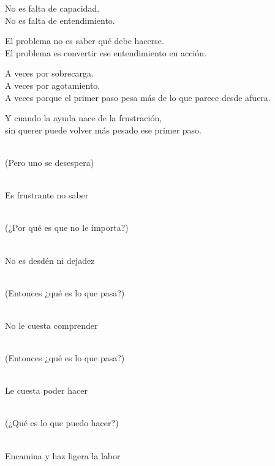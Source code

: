 \begin{lyrics}


No es falta de capacidad.\\
No es falta de entendimiento.

El problema no es saber qué debe hacerse.\\
El problema es convertir ese entendimiento en acción.

A veces por sobrecarga.\\
A veces por agotamiento.\\
A veces porque el primer paso pesa más de lo que parece desde afuera.

Y cuando la ayuda nace de la frustración,\\
sin querer puede volver más pesado ese primer paso.



\\
(Pero uno se desespera)

\\
Es frustrante no saber

\\
(¿Por qué es que no le importa?)

\\
No es desdén ni dejadez

\\
(Entonces ¿qué es lo que pasa?)

\\
No le cuesta comprender

\\
(Entonces ¿qué es lo que pasa?)

\\
Le cuesta poder hacer

\\
(¿Qué es lo que puedo hacer?)

\\
Encamina y haz ligera la labor


\\
\\



\end{lyrics}
